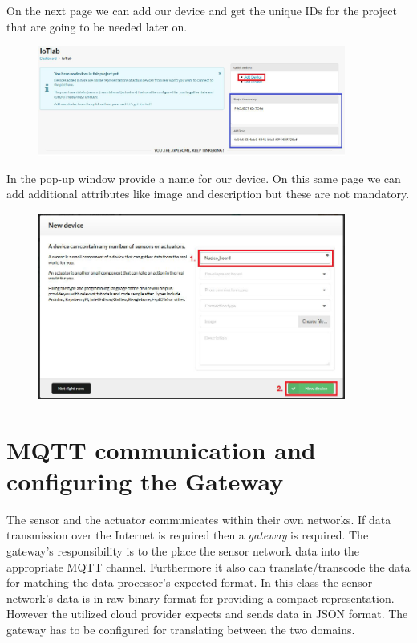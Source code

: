 \documentclass[a4paper]{article}
\begin{document}
On the next page we can add our device and get the unique IDs for the project that are going to be needed later on.

\begin{figure}[H]
    \centering
    \includegraphics[width=0.9\textwidth]{figures/devicehub-adddevice.png}
\end{figure}

In the pop-up window provide a name for our device. On this same page we can add additional attributes like image and
description but these are not mandatory.

\begin{figure}[H]
    \centering
    \includegraphics[width=0.9\textwidth]{figures/devicehub-newdevice.png}
\end{figure}

\section{MQTT communication and configuring the Gateway}

The sensor and the actuator communicates within their own networks. 
If data transmission over the Internet is required then a \emph{gateway} is required.
The gateway's responsibility is to the place the sensor network data into the appropriate
MQTT channel. Furthermore it also can translate/transcode the data for matching the
data processor's expected format. In this class the sensor network's data is in raw binary format
for providing a compact representation. However the utilized cloud provider expects and sends
data in JSON format. The gateway has to be configured for translating between the two domains.
\end{document}
